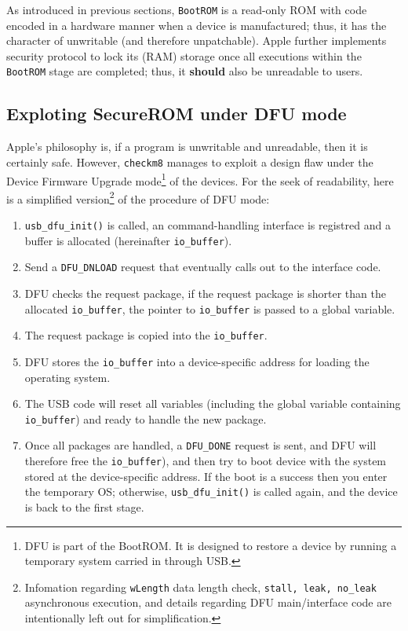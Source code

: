 \documentclass[10pt]{article}
\newcommand{\inlinecode}{\texttt}
\begin{document}
As introduced in previous sections, \inlinecode{BootROM} is a read-only ROM with code encoded in a hardware manner when a device is manufactured; thus, it has the character of unwritable (and therefore unpatchable). Apple further implements security protocol to lock its (RAM) storage once all executions within the \inlinecode{BootROM} stage are completed; thus, it \textbf{should} also be unreadable to users.

\subsection{Exploting SecureROM under DFU mode}

Apple's philosophy is, if a program is unwritable and unreadable, then it is certainly safe. However, \inlinecode{checkm8} manages to exploit a design flaw under the Device Firmware Upgrade mode\footnote{DFU is part of the BootROM. It is designed to restore a device by running a temporary system carried in through USB.} of the devices. For the seek of readability, here is a simplified version\footnote{Infomation regarding \inlinecode{wLength} data length check, \inlinecode{stall, leak, no\_leak} asynchronous execution, and details regarding DFU main/interface code are intentionally left out for simplification.} of the procedure of DFU mode:

\begin{enumerate}
    \item \inlinecode{usb\_dfu\_init()} is called, an command-handling interface is registred and a buffer is allocated (hereinafter \inlinecode{io\_buffer}).
    \item Send a \inlinecode{DFU\_DNLOAD} request that eventually calls out to the interface code.
    \item DFU checks the request package, if the request package is shorter than the allocated \inlinecode{io\_buffer}, the pointer to \inlinecode{io\_buffer} is passed to a global variable.
    \item The request package is copied into the \inlinecode{io\_buffer}.
    \item DFU stores the \inlinecode{io\_buffer} into a device-specific address for loading the operating system.
    \item The USB code will reset all variables (including the global variable containing \inlinecode{io\_buffer}) and ready to handle the new package.
    \item Once all packages are handled, a \inlinecode{DFU\_DONE} request is sent, and DFU will therefore free the \inlinecode{io\_buffer}), and then try to boot device with the system stored at the device-specific address. If the boot is a success then you enter the temporary OS; otherwise, \inlinecode{usb\_dfu\_init()} is called again, and the device is back to the first stage.
\end{enumerate}
\end{document}
